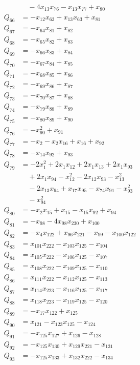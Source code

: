 \begin{align*}
&\quad -4x_{13}x_{76}-x_{13}x_{77}+x_{80}\\
Q_{66}&=-x_{12}x_{63}+x_{13}x_{63}+x_{81}\\
Q_{67}&=-x_{64}x_{81}+x_{82}\\
Q_{68}&=-x_{65}x_{82}+x_{83}\\
Q_{69}&=-x_{66}x_{83}+x_{84}\\
Q_{70}&=-x_{67}x_{84}+x_{85}\\
Q_{71}&=-x_{68}x_{85}+x_{86}\\
Q_{72}&=-x_{69}x_{86}+x_{87}\\
Q_{73}&=-x_{70}x_{87}+x_{88}\\
Q_{74}&=-x_{79}x_{88}+x_{89}\\
Q_{75}&=-x_{80}x_{89}+x_{90}\\
Q_{76}&=-x_{90}^{2}+x_{91}\\
Q_{77}&=-x_{2}-x_{2}x_{16}+x_{16}+x_{92}\\
Q_{78}&=-x_{14}x_{92}+x_{93}\\
Q_{79}&=-2x_{1}^{2}+2x_{1}x_{12}+2x_{1}x_{13}+2x_{1}x_{93}\\
&\quad +2x_{1}x_{94}-x_{12}^{2}-2x_{12}x_{93}-x_{13}^{2}\\
&\quad -2x_{13}x_{94}+x_{17}x_{95}-x_{74}x_{91}-x_{93}^{2}\\
&\quad -x_{94}^{2}\\
Q_{80}&=-x_{2}x_{15}+x_{15}-x_{15}x_{92}+x_{94}\\
Q_{81}&=-x_{98}-4x_{98}x_{230}+x_{100}\\
Q_{82}&=-x_{4}x_{122}+x_{96}x_{221}-x_{99}-x_{100}x_{122}\\
Q_{83}&=x_{101}x_{222}-x_{103}x_{125}-x_{104}\\
Q_{84}&=x_{105}x_{222}-x_{106}x_{125}-x_{107}\\
Q_{85}&=x_{108}x_{222}-x_{109}x_{125}-x_{110}\\
Q_{86}&=x_{111}x_{222}-x_{112}x_{125}-x_{113}\\
Q_{87}&=x_{114}x_{223}-x_{116}x_{125}-x_{117}\\
Q_{88}&=x_{118}x_{223}-x_{119}x_{125}-x_{120}\\
Q_{89}&=-x_{17}x_{122}+x_{125}\\
Q_{90}&=x_{121}-x_{123}x_{125}-x_{124}\\
Q_{91}&=-x_{125}x_{127}+x_{126}-x_{128}\\
Q_{92}&=-x_{125}x_{130}+x_{129}x_{221}-x_{131}\\
Q_{93}&=-x_{125}x_{133}+x_{132}x_{222}-x_{134}\\

\end{align*}
